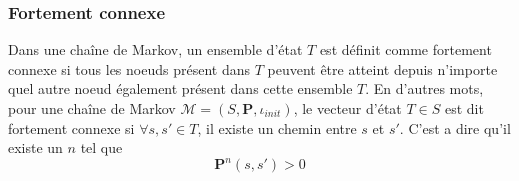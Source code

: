 \documentclass[letterpaper]{article}
\begin{document}
% 
% 
% 
% 
% 
% 
% 
  
  
    \subsubsection{Fortement connexe}
      Dans une chaîne de Markov, un ensemble d'état $T$ est définit comme fortement
      connexe si tous les noeuds présent dans $T$ peuvent être atteint depuis
      n'importe quel autre noeud également présent dans cette ensemble $T$. En
      d'autres mots, pour une chaîne de Markov $\mathcal{M} = (S, \mathbf{P}, 
      \iota_{init})$, le vecteur d'état $T \in S$ est dit fortement connexe 
      si $\forall s, s' \in T$, il existe un chemin entre $s$ et $s'$.  C'est
      a dire qu'il existe un $n$ tel que 
      $$\mathbf{P}^n (s, s') > 0$$
  
\end{document}

